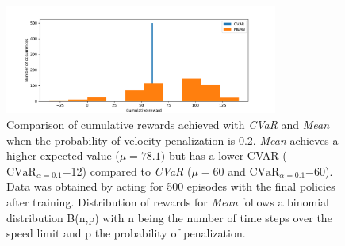\begin{figure}[ht]
        \centering
        \includegraphics[width=0.8\textwidth]{images/Car/histogram_rewards1vs01.pdf}
        \caption{Comparison of cumulative rewards achieved with \textit{CVaR} and \textit{Mean}
        when the probability of velocity penalization is 0.2.
        \textit{Mean} achieves a higher expected value  ($\mu=78.1)$  but 
        has a lower CVAR ($\text{CVaR}_{\alpha= 0.1}$=12) compared to
        \textit{CVaR} ($\mu=60$ and $\text{CVaR}_{\alpha= 0.1}$=60).
        Data was obtained by acting for 500 episodes with the final policies after training.
        Distribution of rewards for \textit{Mean} follows a binomial distribution B(n,p)
        with n being the number of time steps over the speed limit and 
        p the probability of penalization.}
        \label{fig:histogram_cvar_vs_mean}
    
\end{figure}


